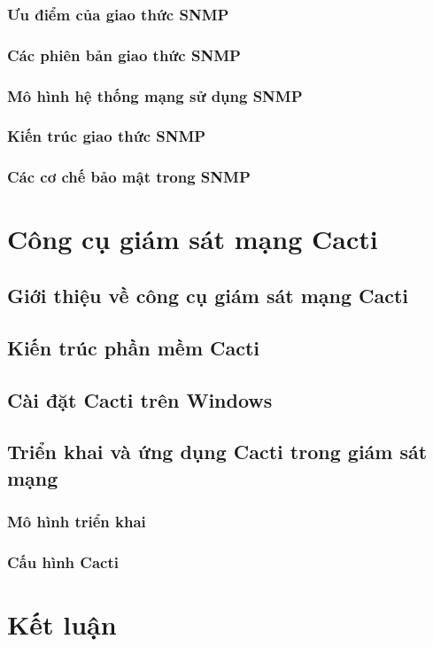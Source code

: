 \documentclass[12pt,oneside,a4paper]{article}
\begin{document}
\subsubsection{Ưu điểm của giao thức SNMP}
\subsubsection{Các phiên bản giao thức SNMP}
\subsubsection{Mô hình hệ thống mạng sử dụng SNMP}
\subsubsection{Kiến trúc giao thức SNMP}
\subsubsection{Các cơ chế bảo mật trong SNMP}

\section{Công cụ giám sát mạng Cacti}
\subsection{Giới thiệu về công cụ giám sát mạng Cacti}
\subsection{Kiến trúc phần mềm Cacti}
\subsection{Cài đặt Cacti trên Windows}
\subsection{Triển khai và ứng dụng Cacti trong giám sát mạng}
\subsubsection{Mô hình triển khai}
\subsubsection{Cấu hình Cacti}

\section*{Kết luận}
%
\end{document}
